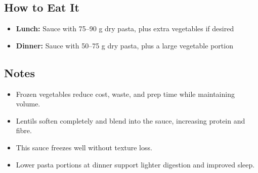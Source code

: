 \documentclass[11pt,a4paper]{article}
\begin{document}
\vspace{0.5em}

\subsection*{How to Eat It}
\begin{itemize}
    \item \textbf{Lunch:} Sauce with 75--90 g dry pasta, plus extra vegetables if desired
    \item \textbf{Dinner:} Sauce with 50--75 g dry pasta, plus a large vegetable portion
\end{itemize}

\vspace{0.5em}

\subsection*{Notes}
\begin{itemize}
    \item Frozen vegetables reduce cost, waste, and prep time while maintaining volume.
    \item Lentils soften completely and blend into the sauce, increasing protein and fibre.
    \item This sauce freezes well without texture loss.
    \item Lower pasta portions at dinner support lighter digestion and improved sleep.
\end{itemize}
\end{document}
